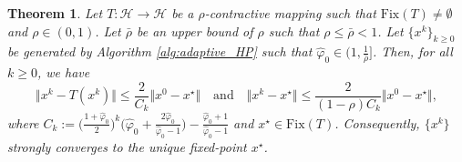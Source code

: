 \documentclass{article}
\theoremstyle{plain}
\newtheorem{theorem}{Theorem}[section]
\theoremstyle{definition}
\newcommand{\Hil}{\mathcal{H}}
\newcommand{\sets}[1]{\{#1\}}
\newcommand{\norms}[1]{\Vert#1\Vert}
\newcommand{\0}{\boldsymbol{0}}
\begin{document}
\begin{theorem}\label{th:convergence_of_adaptive_HP}
Let $ T: \Hil \to \Hil$ be a $\rho$-contractive mapping such that $\mathrm{Fix}(T) \neq \emptyset$ and $\rho \in (0, 1)$.
Let $\bar{\rho}$ be an upper bound of $\rho$ such that $\rho \leq \bar{\rho} < 1$.
Let  $\sets{x^k}_{k\geq 0}$ be generated by Algorithm \ref{alg:adaptive_HP} such that $\hat{\varphi}_0 \in \big(1, \frac{1}{\bar{\rho}}\big]$. 
Then, for all $k \geq 0$, we have 
\begin{equation}\label{eq:convergence_rate}
\norms{ x^k - T(x^k) } \leq \frac{2}{C_k} \norms{x^0 - x^{\star} } \quad \text{and} \quad \norms{x^k - x^{\star}} \leq \frac{2}{(1-\rho)C_k} \norms{x^0 - x^{\star} },
\end{equation}
where $C_k := \big(\frac{1 + \hat{\varphi}_0}{2}\big)^k \big(\hat{\varphi}_0 + \frac{2\hat{\varphi}_0}{\hat{\varphi}_0 -1}\big) - \frac{\hat{\varphi}_0 +  1}{\hat{\varphi}_0 - 1}$ and $x^{\star} \in \mathrm{Fix}(T)$.
Consequently, $\sets{x^k}$ strongly converges to the unique fixed-point $x^{\star}$.
\end{theorem}
\end{document}
